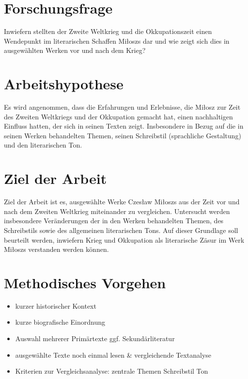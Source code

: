 \documentclass[12pt,a4paper]{article}
\begin{document}
\section{Forschungsfrage}

Inwiefern stellten der Zweite Weltkrieg und die Okkupationszeit einen Wendepunkt im literarischen Schaffen Miłoszs dar und wie zeigt sich dies in ausgewählten Werken vor und nach dem Krieg?


\section{Arbeitshypothese}

Es wird angenommen, dass die Erfahrungen und Erlebnisse, die Miłosz zur Zeit des Zweiten Weltkriegs und der Okkupation gemacht hat, einen nachhaltigen Einfluss hatten, der sich in seinen Texten zeigt. Insbesondere in Bezug auf die in seinen Werken behandelten Themen, seinen Schreibstil (sprachliche Gestaltung) und den literarischen Ton.


\section{Ziel der Arbeit}

Ziel der Arbeit ist es, ausgewählte Werke Czesław Miłoszs aus der Zeit vor und nach dem Zweiten Weltkrieg miteinander zu vergleichen. Untersucht werden insbesondere Veränderungen der in den Werken behandelten Themen, des Schreibstils sowie des allgemeinen literarischen Tons. Auf dieser Grundlage soll beurteilt werden, inwiefern Krieg und Okkupation als literarische Zäsur im Werk Miłoszs verstanden werden können.

\section{Methodisches Vorgehen}

\begin{itemize}
    \item kurzer historischer Kontext
    \item kurze biografische Einordnung
    \item Auswahl mehrerer Primärtexte ggf. Sekundärliteratur 
    \item ausgewählte Texte noch einmal lesen \& vergleichende Textanalyse
    \item Kriterien zur Vergleichsanalyse:
        \iitem zentrale Themen
        \iitem Schreibstil
        \iitem Ton
\end{itemize}
\end{document}
